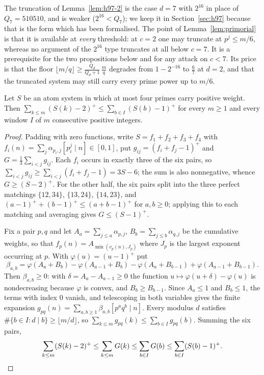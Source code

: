 The truncation of Lemma~\ref{lem:h97-2} is the case $d=7$ with $2^{16}$ in place of $Q_7=510510$, and is weaker
($2^{16}<Q_7$); we keep it in Section~\ref{sec:h97} because that is the form which has been formalised.
The point of Lemma~\ref{lem:primorial} is that it is available at \emph{every} threshold: at $c=2$ one may truncate at
$p^j\le m/6$, whereas no argument of the $2^{16}$ type truncates at all below $c=7$. It is a prerequisite for the two
propositions below and for any attack on $c<7$. Its price is that the floor
$\lfloor m/q\rfloor\ge\tfrac{Q_d}{Q_d+1}\,\tfrac mq$ degrades from $1-2^{-16}$ to $\tfrac67$ at $d=2$, and that the
truncated system may still carry every prime power up to $m/6$.

\begin{proposition}\label{prop:fourprimes}
Let $S$ be an atom system in which at most four primes carry positive weight. Then
$\sum_{k\le m}(S(k)-2)^+\le\sum_{b\in I}(S(b)-1)^+$ for every $m\ge1$ and every window $I$ of $m$ consecutive positive
integers.
\end{proposition}
\begin{proof}
Padding with zero functions, write $S=f_1+f_2+f_3+f_4$ with $f_i(n)=\sum_j\alpha_{p_i,j}[p_i^j\mid n]\in[0,1]$, put
$g_{ij}=(f_i+f_j-1)^+$ and $G=\tfrac13\sum_{i<j}g_{ij}$. Each $f_i$ occurs in exactly three of the six pairs, so
$\sum_{i<j}g_{ij}\ge\sum_{i<j}(f_i+f_j-1)=3S-6$; the sum is also nonnegative, whence $G\ge(S-2)^+$. For the other
half, the six pairs split into the three perfect matchings $\{12,34\}$, $\{13,24\}$, $\{14,23\}$, and
$(a-1)^++(b-1)^+\le(a+b-1)^+$ for $a,b\ge0$; applying this to each matching and averaging gives $G\le(S-1)^+$.

Fix a pair $p,q$ and let $A_a=\sum_{j\le a}\alpha_{p,j}$, $B_b=\sum_{j\le b}\alpha_{q,j}$ be the cumulative weights, so
that $f_p(n)=A_{\min(v_p(n),J_p)}$ where $J_p$ is the largest exponent occurring at $p$. With $\varphi(u)=(u-1)^+$ put
\[
\beta_{a,b}=\varphi(A_a+B_b)-\varphi(A_{a-1}+B_b)-\varphi(A_a+B_{b-1})+\varphi(A_{a-1}+B_{b-1}).
\]
Then $\beta_{a,b}\ge0$: with $\delta=A_a-A_{a-1}\ge0$ the function $u\mapsto\varphi(u+\delta)-\varphi(u)$ is
nondecreasing because $\varphi$ is convex, and $B_b\ge B_{b-1}$. Since $A_a\le1$ and $B_b\le1$, the terms with index
$0$ vanish, and telescoping in both variables gives the finite expansion
$g_{pq}(n)=\sum_{a,b\ge1}\beta_{a,b}[p^aq^b\mid n]$. Every modulus $d$ satisfies
$\#\{b\in I:d\mid b\}\ge\lfloor m/d\rfloor$, so $\sum_{k\le m}g_{pq}(k)\le\sum_{b\in I}g_{pq}(b)$. Summing the six
pairs,
\[
\sum_{k\le m}(S(k)-2)^+\le\sum_{k\le m}G(k)\le\sum_{b\in I}G(b)\le\sum_{b\in I}(S(b)-1)^+ . \qedhere
\]
\end{proof}

